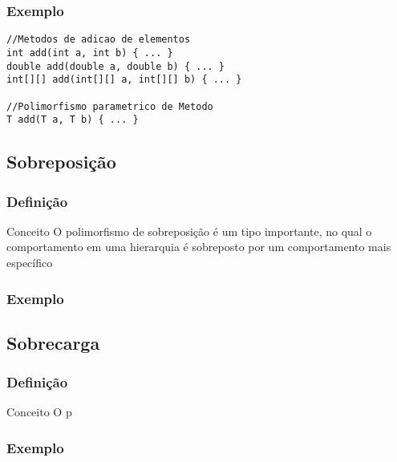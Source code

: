 \begin{frame}[fragile]
\frametitle{Exemplo}
\justifying
\begin{lstlisting}
//Metodos de adicao de elementos
int add(int a, int b) { ... }
double add(double a, double b) { ... }
int[][] add(int[][] a, int[][] b) { ... }

//Polimorfismo parametrico de Metodo
T add(T a, T b) { ... }
\end{lstlisting}
\end{frame}

\subsection{Sobreposição}

\begin{frame}
\frametitle{Definição}
\justifying
\begin{block}{Conceito}
\qquad O polimorfismo de sobreposição é um tipo importante, no qual o comportamento em uma hierarquia é sobreposto por um comportamento mais específico
\end{block}
\end{frame}

\begin{frame}
\frametitle{Exemplo}
\justifying

\end{frame}

\subsection{Sobrecarga}

\begin{frame}
\frametitle{Definição}
\justifying
\begin{block}{Conceito}
\qquad O p
\end{block}
\end{frame}

\begin{frame}
\frametitle{Exemplo}
\justifying

\end{frame}